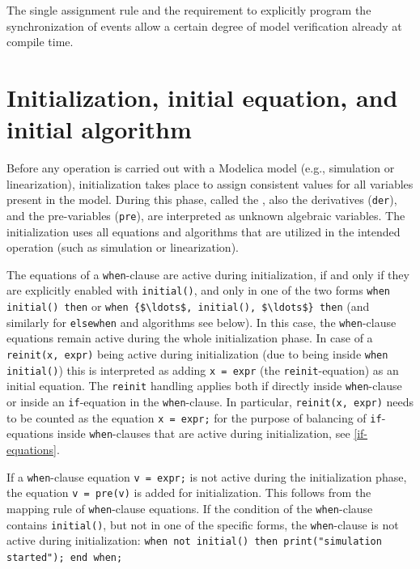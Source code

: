 \begin{nonnormative}
The single assignment rule and the requirement to explicitly program the synchronization of events allow a certain degree of model verification already at compile time.
\end{nonnormative}


\section{Initialization, initial equation, and initial algorithm}\label{initialization-initial-equation-and-initial-algorithm}

Before any operation is carried out with a Modelica model (e.g., simulation or linearization), initialization takes place to assign consistent values for all variables present in the model.
During this phase, called the , also the derivatives (\lstinline!der!), and the pre-variables (\lstinline!pre!), are interpreted as unknown algebraic variables.
The initialization uses all equations and algorithms that are utilized in the intended operation (such as simulation or linearization).

The equations of a \lstinline!when!-clause are active during initialization, if and only if they are explicitly enabled with \lstinline!initial()!, and only in one of the two forms \lstinline!when initial() then! or \lstinline!when {$\ldots$, initial(), $\ldots$} then! (and similarly for \lstinline!elsewhen! and algorithms see below).
In this case, the \lstinline!when!-clause equations remain active during the whole initialization phase.
In case of a \lstinline!reinit(x, expr)! being active during initialization (due to being inside \lstinline!when initial()!) this is interpreted as adding \lstinline!x = expr! (the \lstinline!reinit!-equation) as an initial equation.
The \lstinline!reinit! handling applies both if directly inside \lstinline!when!-clause or inside an \lstinline!if!-equation in the \lstinline!when!-clause.
In particular, \lstinline!reinit(x, expr)! needs to be counted as the equation \lstinline!x = expr;! for the purpose of balancing of \lstinline!if!-equations inside \lstinline!when!-clauses that are active during initialization, see \cref{if-equations}.

\begin{nonnormative}
If a \lstinline!when!-clause equation \lstinline!v = expr;! is not active during the initialization phase, the equation \lstinline!v = pre(v)! is added for initialization.
This follows from the mapping rule of \lstinline!when!-clause equations.
If the condition of the \lstinline!when!-clause contains \lstinline!initial()!, but not in one of the specific forms, the \lstinline!when!-clause is not active during initialization: \lstinline!when not initial() then print("simulation started"); end when;!
\end{nonnormative}

